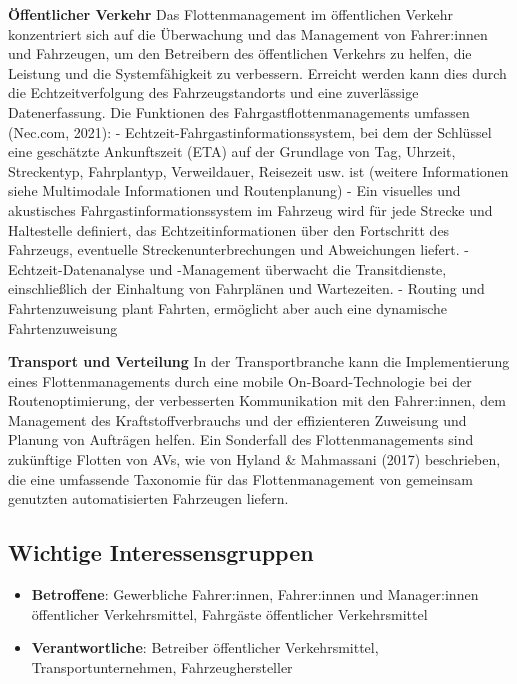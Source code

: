 \documentclass[
]{book}
\providecommand{\tightlist}{%
  \setlength{\itemsep}{0pt}\setlength{\parskip}{0pt}}
\begin{document}
\textbf{Öffentlicher Verkehr}
Das Flottenmanagement im öffentlichen Verkehr konzentriert sich auf die Überwachung und das Management von Fahrer:innen und Fahrzeugen, um den Betreibern des öffentlichen Verkehrs zu helfen, die Leistung und die Systemfähigkeit zu verbessern. Erreicht werden kann dies durch die Echtzeitverfolgung des Fahrzeugstandorts und eine zuverlässige Datenerfassung. Die Funktionen des Fahrgastflottenmanagements umfassen (Nec.com, 2021):
- Echtzeit-Fahrgastinformationssystem, bei dem der Schlüssel eine geschätzte Ankunftszeit (ETA) auf der Grundlage von Tag, Uhrzeit, Streckentyp, Fahrplantyp, Verweildauer, Reisezeit usw. ist (weitere Informationen siehe Multimodale Informationen und Routenplanung)
- Ein visuelles und akustisches Fahrgastinformationssystem im Fahrzeug wird für jede Strecke und Haltestelle definiert, das Echtzeitinformationen über den Fortschritt des Fahrzeugs, eventuelle Streckenunterbrechungen und Abweichungen liefert.
- Echtzeit-Datenanalyse und -Management überwacht die Transitdienste, einschließlich der Einhaltung von Fahrplänen und Wartezeiten.
- Routing und Fahrtenzuweisung plant Fahrten, ermöglicht aber auch eine dynamische Fahrtenzuweisung

\textbf{Transport und Verteilung}
In der Transportbranche kann die Implementierung eines Flottenmanagements durch eine mobile On-Board-Technologie bei der Routenoptimierung, der verbesserten Kommunikation mit den Fahrer:innen, dem Management des Kraftstoffverbrauchs und der effizienteren Zuweisung und Planung von Aufträgen helfen. Ein Sonderfall des Flottenmanagements sind zukünftige Flotten von AVs, wie von Hyland \& Mahmassani (2017) beschrieben, die eine umfassende Taxonomie für das Flottenmanagement von gemeinsam genutzten automatisierten Fahrzeugen liefern.

\hypertarget{wichtige-interessensgruppen-16}{%
\subsection*{Wichtige Interessensgruppen}\label{wichtige-interessensgruppen-16}}

\begin{itemize}
\tightlist
\item
  \textbf{Betroffene}: Gewerbliche Fahrer:innen, Fahrer:innen und Manager:innen öffentlicher Verkehrsmittel, Fahrgäste öffentlicher Verkehrsmittel
\item
  \textbf{Verantwortliche}: Betreiber öffentlicher Verkehrsmittel, Transportunternehmen, Fahrzeughersteller
\end{itemize}
\end{document}
